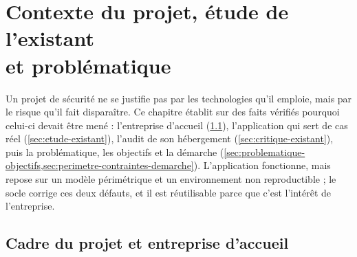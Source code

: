 \chapter[Contexte du projet, étude de l'existant et problématique]%
{Contexte du projet, étude de l'existant\\et problématique}
\label{ch:cadre-existant}

\setlength{\textfloatsep}{10pt plus 2pt minus 2pt}
\setlength{\intextsep}{8pt plus 2pt minus 2pt}
\setlength{\floatsep}{8pt plus 2pt minus 2pt}



Un projet de sécurité ne se justifie pas par les technologies qu'il emploie, mais par le
risque qu'il fait disparaître. Ce chapitre établit sur des faits vérifiés pourquoi celui-ci
devait être mené : l'entreprise d'accueil (\cref{sec:cadre-projet}), l'application qui sert de
cas réel (\cref{sec:etude-existant}), l'audit de son hébergement
(\cref{sec:critique-existant}), puis la problématique, les objectifs et la démarche
(\cref{sec:problematique-objectifs,sec:perimetre-contraintes-demarche}). L'application
fonctionne, mais repose sur un modèle périmétrique et un environnement non reproductible ; le
socle corrige ces deux défauts, et il est réutilisable parce que c'est l'intérêt de
l'entreprise.

\section{Cadre du projet et entreprise d'accueil}
\label{sec:cadre-projet}

